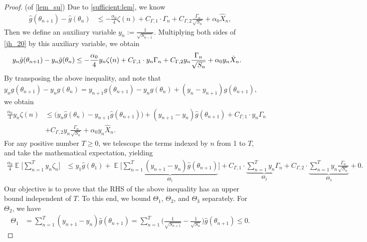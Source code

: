 \documentclass[standalone]{article}
\DeclareMathOperator{\Expect}{\mathbb{E}}
\begin{document}
\begin{proof}(of \cref{lem_su})
Due to \cref{sufficient:lem}, we know
\begin{align}\label{jh_20}
\hat{g}(\theta_{n+1})-\hat{g}(\theta_{n}) & \le -\frac{\alpha_{0}}{4}\zeta(n)+C_{\Gamma, 1}\cdot \Gamma_n  + C_{\Gamma, 2}\frac{\Gamma_{n}}{\sqrt{S_{n}}} + \alpha_0 \hat{X}_{n},
\end{align}
Then we define an auxiliary variable $ y_{n} := \frac{1}{\sqrt{S_{n-1}}}$. Multiplying both sides of \cref{jh_20} by this auxiliary variable, we obtain
\begin{align*}
y_{n}\hat{g}(\theta_{n+1})-y_{n}\hat{g}(\theta_{n}) & \le  -\frac{\alpha_{0}}{4}y_{n}\zeta(n)+C_{\Gamma, 1}\cdot y_{n}\Gamma_n  + C_{\Gamma, 2}y_{n}\frac{\Gamma_{n}}{\sqrt{S_{n}}} + \alpha_0 y_{n}\hat{X}_{n}\notag.
\end{align*}
By transposing the above inequality, and note that 
\(y_{n}g(\theta_{n+1}) - y_{n}g(\theta_{n}) = y_{n+1}g(\theta_{n+1}) - y_{n}g(\theta_{n}) + (y_{n} - y_{n+1})g(\theta_{n+1}),\) we obtain
\begin{equation}\nonumber\begin{aligned}
\frac{\alpha_{0}}{4}y_{n}\zeta(n)&\le \big(y_{n}\hat{g}(\theta_{n})-y_{n+1}\hat{g}(\theta_{n+1})\big)+{(y_{n+1}-y_{n})\hat{g}(\theta_{n+1})}+C_{\Gamma, 1}\cdot y_{n}\Gamma_n\\&+C_{\Gamma,2}y_{n}\frac{\Gamma_{n}}{\sqrt{S_{n}}}+\alpha_0 y_{n}\hat{X}_{n}.
\end{aligned}\end{equation}
For any positive number \(T \ge 0\), we telescope the terms indexed by \(n\) from 1 to \(T\), and take the mathematical expectation, yielding
\begin{align}\label{ada_q_1}
\frac{\alpha_{0}}{4}\Expect\Bigg[\sum_{n=1}^{T}y_{n}\zeta_{n}\Bigg]&{\leq} y_{1}\hat{g}(\theta_{1})+\Expect\Bigg[\underbrace{\sum_{n=1}^{T}(y_{n+1}-y_{n})\hat{g}(\theta_{n+1})}_{\Theta_{1}}\Bigg]+C_{\Gamma,1}\cdot\underbrace{\sum_{n=1}^{T}y_{n}\Gamma_{n}}_{\Theta_{2}}+C_{\Gamma,2}\cdot\underbrace{\sum_{n=1}^{T}y_{n}\frac{\Gamma_{n}}{\sqrt{S_{n}}}}_{\Theta_{3}}+0.
\end{align}
Our objective is to prove that the RHS of the above inequality has an upper bound independent of $T.$ To this end, we bound $\Theta_{1}$, $\Theta_{2}$, and $\Theta_{3}$ separately. For $\Theta_{2}$, we have
\begin{align}\label{jh_02}
\Theta_{1}&=\sum_{n=1}^{T}(y_{n+1}-y_{n})\hat{g}(\theta_{n+1})=\sum_{n=1}^{T}\Big(\frac{1}{\sqrt{S_{n+1}}}-\frac{1}{\sqrt{S_{n}}}\Big)\hat{g}(\theta_{n+1})\le 0.

\end{align}
\end{proof}
\end{document}
